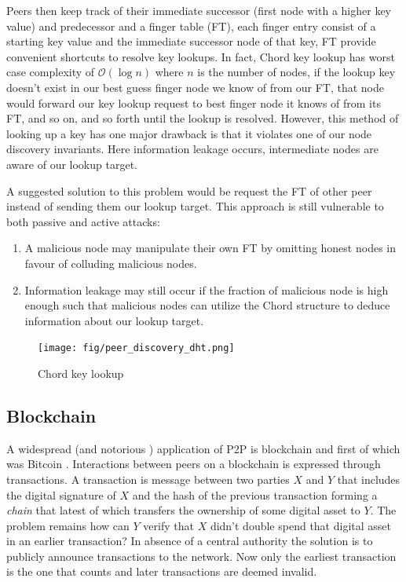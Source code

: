 \documentclass[12pt,twocolumn]{article}
\begin{document}
Peers then keep track of their immediate successor (first node with a higher key value) and predecessor
and a finger table (FT), each finger entry consist of a starting key value and the immediate successor node of that key,
FT provide convenient shortcuts to resolve key lookups. In fact, Chord key lookup has worst case complexity of 
$\mathcal{O}(\log n)$ \cite{chord} where $n$ is the number of nodes,
if the lookup key doesn't exist in our best guess finger node we know of from our FT, that node would forward our key lookup request to
best finger node it knows of from its FT, and so on, and so forth until the lookup is resolved. However, this method of looking up a key has one major
drawback is that it violates one of our node discovery invariants. Here information leakage occurs, intermediate nodes are aware of our lookup target.

A suggested solution to this problem would be request the FT of other peer instead of sending them our lookup target. 
This approach is still vulnerable to both passive and active attacks:
\begin{enumerate}
    \item A malicious node may manipulate their own FT by 
        omitting honest nodes in favour of colluding malicious nodes.
    \item Information leakage may still occur if the fraction of malicious node is 
        high enough such that malicious nodes can utilize the Chord structure 
        to deduce information about our lookup target.
\end{enumerate}
\begin{figure}[h]
    \texttt{[image: fig/peer\_discovery\_dht.png]}
    \caption{Chord key lookup}
\end{figure}

\subsection{Blockchain\label{Blockchain}}
A widespread (and notorious \cite{crypto:ban}) application of P2P is blockchain
and first of which was Bitcoin \cite{bitcoin}. Interactions between peers on a blockchain
is expressed through transactions. A transaction is message between two parties $X$ and $Y$ that includes the digital signature \cite{security_book} of $X$
and the hash of the previous transaction forming a \textit{chain} that latest of which transfers the ownership of some digital asset to $Y$. 
The problem remains how can $Y$ verify that $X$ didn't double spend that digital asset in an earlier transaction?
In absence of a central authority the solution is to publicly announce transactions to the network. Now only the earliest transaction is the one that
counts and later transactions are deemed invalid.
\end{document}
